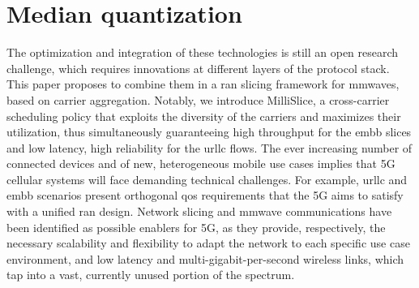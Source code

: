 \documentclass[a4paper, 12pt, oneside]{article}
\begin{document}
  \section*{Median quantization}
  The optimization and integration of these technologies is still an open research challenge, which requires innovations at different layers of the protocol stack. This paper proposes to combine them in a \gls{ran} slicing framework for \glspl{mmwave}, based on carrier aggregation. Notably, we introduce MilliSlice, a cross-carrier scheduling policy that exploits the diversity of the carriers and maximizes their utilization, thus simultaneously guaranteeing high throughput for the \gls{embb} slices and low latency, high reliability for the \gls{urllc} flows.
    The ever increasing number of connected devices and of new, heterogeneous mobile use cases implies that 5G cellular systems will face demanding technical challenges. For example, \gls{urllc} and \gls{embb} scenarios present orthogonal \gls{qos} requirements that the 5G aims to satisfy with a unified \gls{ran} design. Network slicing and \gls{mmwave} communications have been identified as possible enablers for 5G, as they provide, respectively, the necessary scalability and flexibility to adapt the network to each specific use case environment, and low latency and multi-gigabit-per-second wireless links, which tap into a vast, currently unused portion of the spectrum.
\end{document}
